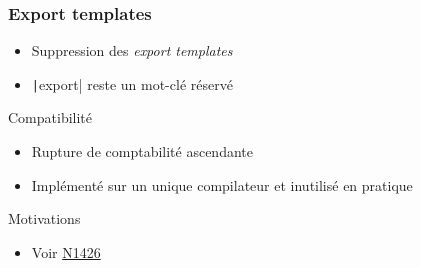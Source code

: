 \documentclass[C++.tex]{subfiles}
\begin{document}
\begin{frame}[fragile]
	\frametitle{Export templates}
	\begin{itemize}
		\item Suppression des \textit{export templates}
		\item \texttt|export| reste un mot-clé réservé
	\end{itemize}

	\begin{block}{Compatibilité}
		\begin{itemize}
			\item Rupture de comptabilité ascendante
			\item Implémenté sur un unique compilateur et inutilisé en pratique
		\end{itemize}

	\end{block}

	\begin{block}{Motivations}
		\begin{itemize}
			\item Voir \href{http://www.open-std.org/jtc1/sc22/wg21/docs/papers/2003/n1426.pdf}{N1426\linklogo}
		\end{itemize}

	\end{block}
\end{frame}
\end{document}

